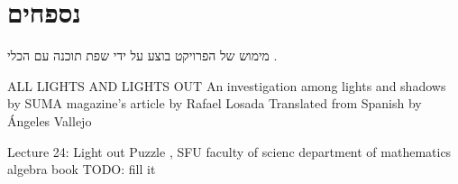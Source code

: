 \documentclass[12pt,twoside]{article}
\begin{document}
\section{נספחים}
מימוש של הפרויקט בוצע על ידי 
שפת תוכנה 
עם הכלי 
.


\newpage
\begin{thebibliography}{99}
\unsethebrew
{} ALL LIGHTS AND LIGHTS OUT
An investigation among lights and shadows by
SUMA magazine’s article by Rafael Losada
Translated from Spanish by Ángeles Vallejo

 Lecture 24: Light out Puzzle , SFU faculty of scienc department of mathematics
 algebra book TODO: fill it
\end{thebibliography}
\end{document}
